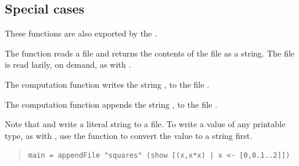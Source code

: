 \subsection{Special cases}
These functions are also exported by the .\par
\begin{haddockdesc}
\item[\begin{tabular}{@{}l}
readFile :: FilePath -> IO String
\end{tabular}]
{\haddockbegindoc
The  function reads a file and
 returns the contents of the file as a string.
 The file is read lazily, on demand, as with .\par}
\end{haddockdesc}
\begin{haddockdesc}
\item[\begin{tabular}{@{}l}
writeFile :: FilePath -> String -> IO ()
\end{tabular}]
{\haddockbegindoc
The computation   function writes the string ,
 to the file .\par}
\end{haddockdesc}
\begin{haddockdesc}
\item[\begin{tabular}{@{}l}
appendFile :: FilePath -> String -> IO ()
\end{tabular}]
{\haddockbegindoc
The computation   function appends the string ,
 to the file .\par
Note that  and  write a literal string
 to a file.  To write a value of any printable type, as with ,
 use the  function to convert the value to a string first.\par
\begin{quote}
{\haddockverb\begin{verbatim}
main = appendFile "squares" (show [(x,x*x) | x <- [0,0.1..2]])\end{verbatim}}
\end{quote}}
\end{haddockdesc}
